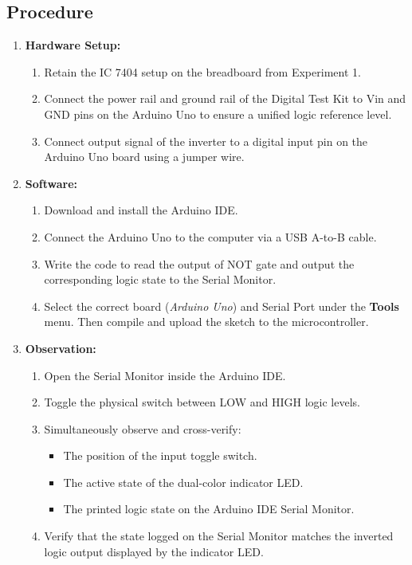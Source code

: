 \documentclass[11pt, a4paper]{article}
\begin{document}
\subsection{Procedure}
\begin{enumerate}
    \item \textbf{Hardware Setup:}
    \begin{enumerate}
        \item Retain the IC 7404 setup on the breadboard from Experiment 1.
        \item Connect the power rail and ground rail of the Digital Test Kit to $\text{Vin}$ and $\text{GND}$ pins on the Arduino Uno to ensure a unified logic reference level.
        \item Connect output signal of the inverter to a digital input pin on the Arduino Uno board using a jumper wire.
    \end{enumerate}

    \item \textbf{Software:}
    \begin{enumerate}
        \item Download and install the Arduino IDE.
        \item Connect the Arduino Uno to the computer via a USB A-to-B cable.
        \item Write the code to read the output of NOT gate and output the corresponding logic state to the Serial Monitor.
        \item Select the correct board (\textit{Arduino Uno}) and Serial Port under the \textbf{Tools} menu. Then compile and upload the sketch to the microcontroller.
    \end{enumerate}

    \item \textbf{Observation:}
    \begin{enumerate}
        \item Open the Serial Monitor inside the Arduino IDE.
        \item Toggle the physical switch between LOW and HIGH logic levels.
        \item Simultaneously observe and cross-verify:
        \begin{itemize}
            \item The position of the input toggle switch.
            \item The active state of the dual-color indicator LED.
            \item The printed logic state on the Arduino IDE Serial Monitor.
        \end{itemize}
        \item Verify that the state logged on the Serial Monitor matches the inverted logic output displayed by the indicator LED.
    \end{enumerate}
\end{enumerate}
\end{document}
